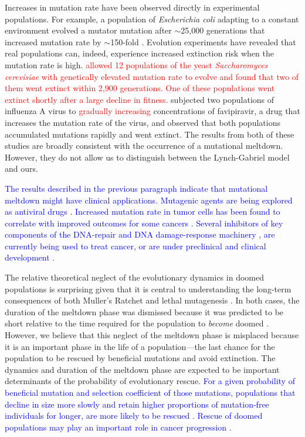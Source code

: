 \documentclass[9pt,lineno]{elife}
\newcommand{\blue}{\textcolor{blue}}
\newcommand{\red}{\textcolor{red}}
\begin{document}
Increases in mutation rate have been observed directly in experimental populations.  For example, a population of \emph{Escherichia coli} adapting to a constant environment evolved a mutator mutation after $\sim$25,000  generations that increased mutation rate by $\sim$150-fold \citep{bar09, wie13}.
%
Evolution experiments have revealed that real populations can, indeed, experience  increased extinction risk when the mutation rate is high.  
%
\red{\citet{zey01a} allowed 12 populations of the yeast \textit{Saccharomyces cerevisiae} with genetically elevated mutation rate to evolve and found that two of them went extinct within 2,900 generations.  One of these populations went extinct shortly after a large decline in fitness.}
%
\citet{ban16} subjected two populations of influenza A virus to \red{gradually increasing} concentrations of favipiravir, a drug that increases the mutation rate of the virus, and observed that both populations accumulated mutations rapidly and went extinct. 
%
The results from both of these studies are broadly consistent with the occurrence of a mutational meltdown.  However, they do not allow us to distinguish between the Lynch-Gabriel model and ours.

\blue{The results described in the previous paragraph indicate that mutational meltdown might have clinical applications.  
%
Mutagenic agents are being explored as antiviral drugs \citep{loe99, cro01, par01, ban16}.
%
Increased mutation rate in tumor cells has been found to correlate with improved outcomes for some cancers \citep{sil00, bir11, and16}.  
%
Several inhibitors of key components of the DNA-repair and DNA damage-response machinery \citep[e.g., PARP inhibitors,][]{lor15}, are currently being used to treat cancer, or are under preclinical and clinical development \citep{bro17}.}

The relative theoretical neglect of the evolutionary dynamics in doomed populations is surprising given that it is central to understanding the long-term consequences of both Muller's Ratchet \citep{Lynch_MUTATION_1990,lyn93,Gabriel_MULLER_1993,lyn95} and lethal mutagenesis \citep{Bull_Theory_2007, mat17}.  
%
In both cases, the duration of the meltdown phase was dismissed because it was predicted to be short relative to the time required for the population to \textit{become} doomed \citep{lyn93,lyn95,Bull_Theory_2007}.
%
However, we believe that this neglect of the meltdown phase is misplaced because it
is an important phase in the life of a population---the last chance for the population to be rescued by beneficial mutations and avoid extinction.  The dynamics and duration of the meltdown phase are expected to be important determinants of the probability of evolutionary rescue.  \blue{For a given probability of beneficial mutation and selection coefficient of those mutations, populations that decline in size more slowly and retain higher proportions of mutation-free individuals for longer, are more likely to be rescued \citep{mar13}.  
%
Rescue of doomed populations may play an important role in cancer progression \citep{McFarland_Impact_2013, McFarland_Tug_2014}.}
\end{document}
